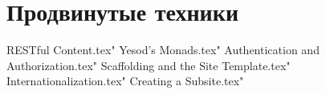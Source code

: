 
\part{Продвинутые техники}

 RESTful Content.tex"
 Yesod's Monads.tex"
 Authentication and Authorization.tex"
 Scaffolding and the Site Template.tex"
 Internationalization.tex"
 Creating a Subsite.tex"


